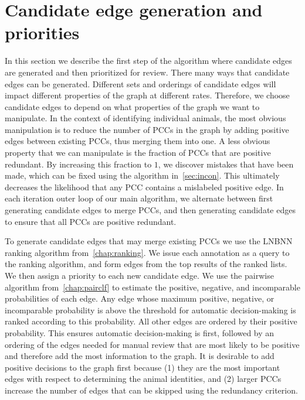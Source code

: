 

\section{Candidate edge generation and priorities}\label{sec:cand}

In this section we describe the first step of the algorithm where candidate edges are generated and then
  prioritized for review.
There many ways that candidate edges can be generated.
Different sets and orderings of candidate edges will impact different properties of the graph at different rates.
Therefore, we choose candidate edges to depend on what properties of the graph we want to manipulate.
In the context of identifying individual animals, the most obvious manipulation is to reduce the number of PCCs
  in the graph by adding positive edges between existing PCCs, thus merging them into one.
A less obvious property that we can manipulate is the fraction of PCCs that are positive redundant.
By increasing this fraction to $1$, we discover mistakes that have been made, which can be fixed using the
  algorithm in~\cref{sec:incon}.
This ultimately decreases the likelihood that any PCC contains a mislabeled positive edge.
In each iteration outer loop of our main algorithm, we alternate between first generating candidate edges to
  merge PCCs, and then generating candidate edges to ensure that all PCCs are positive redundant.

To generate candidate edges that may merge existing PCCs we use the LNBNN ranking algorithm
  from~\cref{chap:ranking}.
We issue each annotation as a query to the ranking algorithm, and form edges from the top results of the ranked
  lists.
We then assign a priority to each new candidate edge.
We use the pairwise algorithm from~\cref{chap:pairclf} to estimate the positive, negative, and incomparable
  probabilities of each edge.
Any edge whose maximum positive, negative, or incomparable probability is above the threshold for automatic
  decision-making is ranked according to this probability.
All other edges are ordered by their positive probability.
This ensures automatic decision-making is first, followed by an ordering of the edges needed for manual review
  that are most likely to be positive and therefore add the most information to the graph.
It is desirable to add positive decisions to the graph first because
(1) they are the most important edges with respect to determining the animal identities, and
(2) larger PCCs increase the number of edges that can be skipped using the redundancy criterion.

